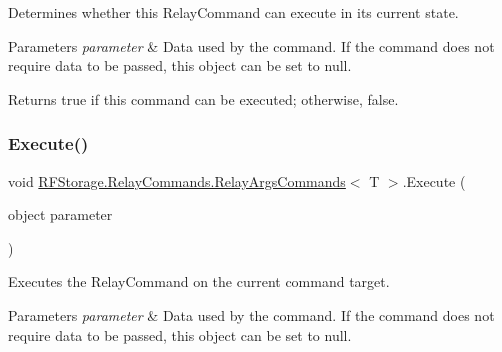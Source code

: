 Determines whether this Relay\+Command can execute in its current state. 


\begin{DoxyParams}{Parameters}
{\em parameter} & Data used by the command. If the command does not require data to be passed, this object can be set to null. \\
\hline
\end{DoxyParams}
\begin{DoxyReturn}{Returns}
true if this command can be executed; otherwise, false.
\end{DoxyReturn}
\mbox{\label{class_r_f_storage_1_1_relay_commands_1_1_relay_args_commands_aed116bf39b06cdb99782ea420193c5af}} 
\subsubsection{\texorpdfstring{Execute()}{Execute()}}
{\footnotesize\ttfamily void \mbox{\hyperlink{class_r_f_storage_1_1_relay_commands_1_1_relay_args_commands}{R\+F\+Storage.\+Relay\+Commands.\+Relay\+Args\+Commands}}$<$ T $>$.Execute (\begin{DoxyParamCaption}\item[{object}]{parameter }\end{DoxyParamCaption})}



Executes the Relay\+Command on the current command target. 


\begin{DoxyParams}{Parameters}
{\em parameter} & Data used by the command. If the command does not require data to be passed, this object can be set to null. \\
\hline
\end{DoxyParams}
\mbox{\label{class_r_f_storage_1_1_relay_commands_1_1_relay_args_commands_a357c2ddda1853ab7004ad0a59eda5e64}} 
